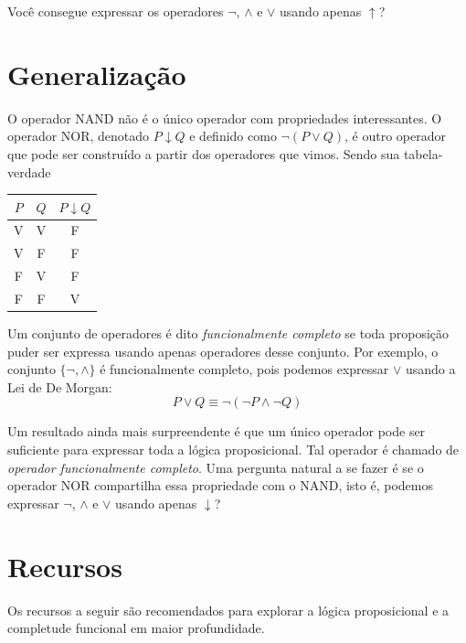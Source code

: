 \documentclass{article}
\begin{document}
Você consegue expressar os operadores $\neg$, $\land$ e $\lor$ 
usando apenas $\uparrow$?
\newpage
\section{Generalização}
O operador NAND não é o único operador com propriedades interessantes. 
O operador NOR, denotado $P \downarrow Q$ e definido como $\neg(P \lor Q)$, 
é outro operador que pode ser construído a partir dos operadores que vimos. 
Sendo sua tabela-verdade

\begin{center}
\begin{tabular}{|c c|c|}
\hline
$P$ & $Q$ & $P \downarrow Q$\\
\hline
V & V & F \\
V & F & F \\
F & V & F \\
F & F & V \\
\hline
\end{tabular}
\end{center}

Um conjunto de operadores é dito \textit{funcionalmente completo} se toda 
proposição puder ser expressa usando apenas operadores desse conjunto. 
Por exemplo, o conjunto $\{\neg, \land\}$ é funcionalmente completo, 
pois podemos expressar $\lor$ usando a Lei de De Morgan:
$$P \lor Q \equiv \neg(\neg P \land \neg Q)$$

Um resultado ainda mais surpreendente é que um único operador pode ser 
suficiente para expressar toda a lógica proposicional. Tal operador é 
chamado de \textit{operador funcionalmente completo}. Uma pergunta natural 
a se fazer é se o operador NOR compartilha essa propriedade com o NAND, 
isto é, podemos expressar $\neg$, $\land$ e $\lor$ usando apenas $\downarrow$?
\newpage
\section{Recursos}

Os recursos a seguir são recomendados para explorar a lógica proposicional 
e a completude funcional em maior profundidade.
\end{document}
